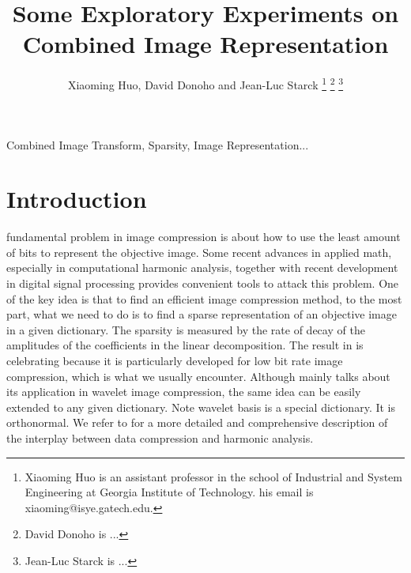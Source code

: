 \documentclass[11pt,draft]{IEEEtran} %
\begin{document}
\title{Some Exploratory Experiments on Combined Image Representation} %

\author{Xiaoming Huo, David Donoho and Jean-Luc Starck
\thanks{Xiaoming Huo is an assistant professor in the school of
  Industrial and System Engineering at Georgia Institute of Technology.
  his email is xiaoming@isye.gatech.edu.}
\thanks{David Donoho is ...}
\thanks{Jean-Luc Starck is ...}}
\date{}
\maketitle

\begin{abstract}

\end{abstract}

\begin{keywords}
Combined Image Transform, Sparsity, Image Representation...
\end{keywords}

\section{Introduction}
 fundamental problem in image compression is about how 
to use the least amount of bits to represent the objective image. Some 
recent advances in applied math, especially in computational harmonic
analysis, together with recent development in digital signal
processing provides convenient tools to attack this problem. One of
the key idea \cite{MallatFalzon} is that to find an efficient image
compression method, to the most part, what we need to do is to find a
sparse representation of an objective image in a given dictionary. The 
sparsity is measured by the rate of decay of the amplitudes of the
coefficients in the linear decomposition. The result in
\cite{MallatFalzon} is celebrating because it is particularly developed 
for low bit rate image compression, which is what we usually
encounter. Although \cite{MallatFalzon} mainly talks about its
application in wavelet image compression, the same idea can be easily
extended to any given dictionary. Note wavelet basis is a special
dictionary. It is orthonormal. We refer to \cite{DonohoIT50} for a
more detailed and comprehensive description of the interplay between
data compression and harmonic analysis.
\end{document}
